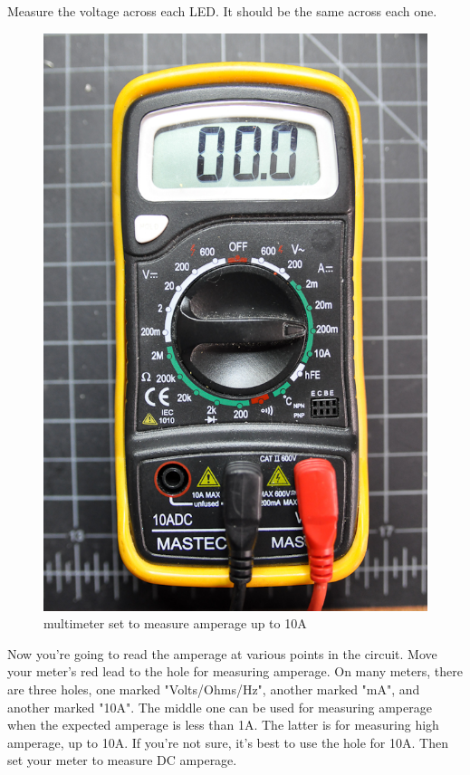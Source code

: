 Measure the voltage across each LED. It should be the same across each one.

\begin{figure}[!htb]
 \centering
 \includegraphics[scale=0.3]{img/electronics/multimeter_amperage_low.jpg}
 \caption{multimeter set to measure amperage up to 10A}
 \label{multimeter set to measure amperage up to 10A}
\end{figure}

Now you're going to read the amperage at various points in the circuit. Move your meter's red lead to the hole for measuring amperage. On many meters, there are three holes, one marked "Volts/Ohms/Hz", another marked "mA", and another marked "10A". The middle one can be used for measuring amperage when the expected amperage is less than 1A. The latter is for measuring high amperage, up to 10A. If you're not sure, it's best to use the hole for 10A. Then set your meter to measure DC amperage.

